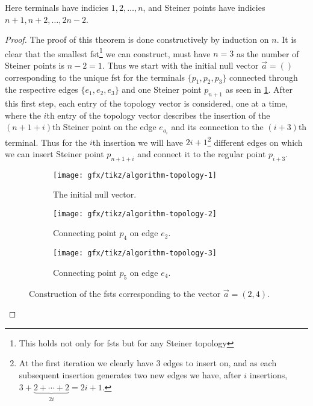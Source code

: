 Here terminals have indicies $1, 2, \ldots, n$, and Steiner points have indicies
$n + 1, n + 2, \ldots, 2 n - 2$.

\begin{proof}
The proof of this theorem is done constructively by induction on $n$. It is
clear that the smallest \ac{fst}\footnote{This holds not only for \acp{fst}
  but for any Steiner topology} we can construct, must have $n = 3$ as the
number of Steiner points is $n - 2 = 1$. Thus we start with the initial null
vector $\vec{a} = ()$ corresponding to the unique \ac{fst} for the terminals
$\{p_1, p_2, p_3\}$ connected through the respective edges $\{e_1, e_2, e_3\}$ and one
Steiner point $p_{n+1}$ as seen in \cref{fig:algorithm-topology-1}. After this
first step, each entry of the topology vector is considered, one at a time,
where the $i$th entry of the topology vector describes the insertion of the
$(n+1+i)$th Steiner point on the edge $e_{a_{i}}$ and its connection to the
$(i+3)$th terminal. Thus for the $i$th insertion we will have
$2i+1$\footnote{At the first iteration we clearly have $3$ edges to insert on, and
  as each subsequent insertion generates two new edges we have, after $i$
  insertions, $3 + \underbrace{2 + \cdots + 2}_{2 i} = 2 i + 1$.} different
edges on which we can insert Steiner point $p_{n + 1 + i}$ and connect it to the
regular point $p_{i+3}$.
%
\begin{figure}[htbp] \centering
  \begin{subfigure}[t]{0.267\textwidth}
    \texttt{[image: gfx/tikz/algorithm-topology-1]}
    \caption{The initial null vector.\label{fig:algorithm-topology-1}}
  \end{subfigure}\hspace{1em}%
  \begin{subfigure}[t]{0.267\textwidth}
    \texttt{[image: gfx/tikz/algorithm-topology-2]}
    \caption{Connecting point $p_4$ on edge $e_2$.\label{fig:algorithm-topology-2}}
  \end{subfigure}\hspace{1em}%
  \begin{subfigure}[t]{0.267\textwidth}
    \texttt{[image: gfx/tikz/algorithm-topology-3]}
    \caption{Connecting point $p_5$ on edge $e_4$.\label{fig:algorithm-topology-3}}
  \end{subfigure}
  \caption[Construction of FSTs]{Construction of the \acp{fst} corresponding
to the vector $\vec{a} = (2, 4)$.\label{fig:algorithm-topologies}}
\end{figure}
\end{proof}

